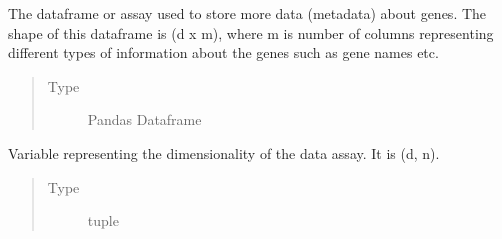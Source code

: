 \documentclass[letterpaper,10pt,english]{sphinxmanual}
\begin{document}
\begin{fulllineitems}
\begin{fulllineitems}
\begin{quote}
\begin{description}
\end{description}\end{quote}

\end{fulllineitems}


\begin{fulllineitems}
\label{\detokenize{index:singlecelldata.SingleCell.genedata}}
The dataframe or assay used to store more data (metadata) about genes. The shape of this dataframe
is (d x m), where m is number of columns representing different types of information
about the genes such as gene names etc.
\begin{quote}\begin{description}
\item[{Type}] \leavevmode
Pandas Dataframe

\end{description}\end{quote}

\end{fulllineitems}


\begin{fulllineitems}
\label{\detokenize{index:singlecelldata.SingleCell.dim}}
Variable representing the dimensionality of the data assay. It is (d, n).
\begin{quote}\begin{description}
\item[{Type}] \leavevmode
tuple

\end{description}\end{quote}

\end{fulllineitems}



\end{fulllineitems}
\end{document}
